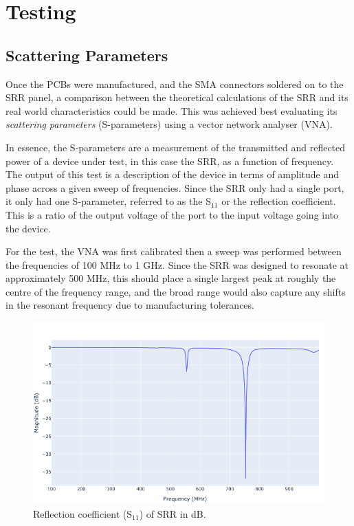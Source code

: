 \section{Testing}
\subsection{Scattering Parameters}

Once the PCBs were manufactured, and the SMA connectors soldered on to the SRR panel, a comparison between the theoretical calculations of the SRR and its real world characteristics could be made. This was achieved best evaluating its \textit{scattering parameters} (S-parameters) using a vector network analyser (VNA). 

In essence, the S-parameters are a measurement of the transmitted and reflected power of a device under test, in this case the SRR, as a function of frequency. The output of this test is a description of the device in terms of amplitude and phase across a given sweep of frequencies. Since the SRR only had a single port, it only had one S-parameter, referred to as the S$_{11}$ or the reflection coefficient. This is a ratio of the output voltage of the port to the input voltage going into the device. 

For the test, the VNA was first calibrated then a sweep was performed between the frequencies of 100 MHz to 1 GHz. Since the SRR was designed to resonate at approximately 500 MHz, this should place a single largest peak at roughly the centre of the frequency range, and the broad range would also capture any shifts in the resonant frequency due to manufacturing tolerances. 

\begin{figure}[h!]
	\centering
	\includegraphics[width=\linewidth]{chapter_4/figures/S11.png}
	\caption{Reflection coefficient (S$_{11}$) of SRR in dB.}
	\label{fig:SRR_s11}
\end{figure}


